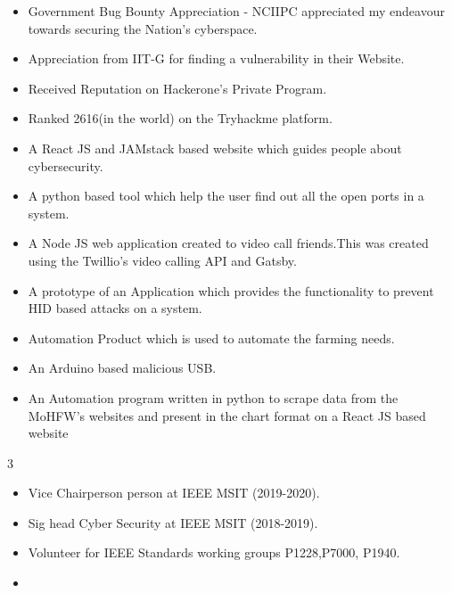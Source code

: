 
\begin{itemize}
\item Government Bug Bounty Appreciation - NCIIPC appreciated my endeavour towards securing the Nation's cyberspace.
\item Appreciation from IIT-G for finding a vulnerability in their Website.
\item Received Reputation on Hackerone's Private Program.
\item Ranked 2616(in the world) on the Tryhackme platform.
\end{itemize}

\begin{itemize}
\item A React JS and JAMstack based website which guides people about cybersecurity. 
\end{itemize}

\begin{itemize}
\item A python based tool which help the user find out all the open ports in a system.
\end{itemize}

\begin{itemize}
\item A Node JS web application created to video call friends.This was created using the Twillio's video calling  API and Gatsby.  
\end{itemize}

\begin{itemize}
\item A prototype of an Application which provides the functionality to prevent HID based attacks on a system.
\end{itemize}

\begin{itemize}
\item Automation Product which is used to automate the farming needs.
\end{itemize}

\begin{itemize}
\item An Arduino based malicious USB.  
\end{itemize}

\begin{itemize}
\item An Automation program written in python to scrape data from the MoHFW's websites and present in the chart format on a React JS based website
\end{itemize}
 {3}

\begin{itemize}
\item Vice Chairperson person at IEEE MSIT (2019-2020).
\item Sig head Cyber Security at IEEE MSIT (2018-2019).
\item Volunteer for IEEE Standards working groups  P1228,P7000, P1940.
\item \end{itemize}


